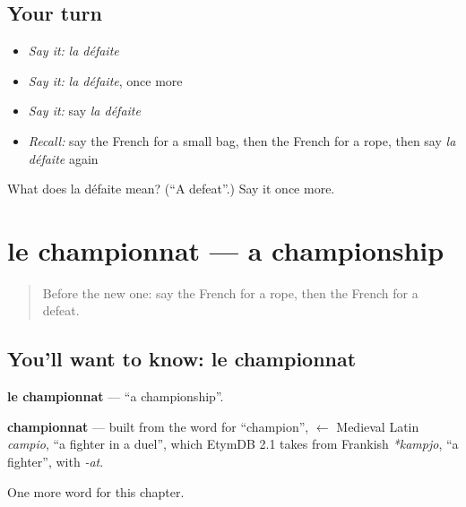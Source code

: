 \subsection*{Your turn}
\begin{itemize}
\raggedright
  \item \emph{Say it:} \emph{la défaite}
  \item \emph{Say it:} \emph{la défaite}, once more
  \item \emph{Say it:} say \emph{la défaite}
  \item \emph{Recall:} say the French for a small bag, then the French for a rope, then say \emph{la défaite} again
\end{itemize}

\begin{tcolorbox}[breakable,colback=teal!4,colframe=teal!35!black,title={Before you move on}]
What does la défaite mean? (\textquotedblleft{}A defeat\textquotedblright{}.) Say it once more.
\end{tcolorbox}
\section[le championnat]{le championnat — a championship}

\label{lesson:FR-C203-championnat}



\begin{quote}
Before the new one: say the French for a rope, then the French for a defeat.
\end{quote}

\subsection*{You'll want to know: le championnat}
\textbf{le championnat} — \textquotedblleft{}a championship\textquotedblright{}.

\begin{cousinweb}
\textbf{championnat} — built from the word for \textquotedblleft{}champion\textquotedblright{}, $\leftarrow$ Medieval Latin \emph{campio}, \textquotedblleft{}a fighter in a duel\textquotedblright{}, which EtymDB 2.1 takes from Frankish \emph{*kampjo}, \textquotedblleft{}a fighter\textquotedblright{}, with \emph{-at}.
\end{cousinweb}

\begin{grammarlens}[title={What you've built}]
One more word for this chapter.
\end{grammarlens}

